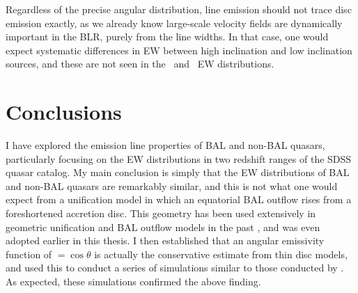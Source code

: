 Regardless of the precise angular distribution, 
line emission should not trace disc emission
exactly, as we already know large-scale velocity fields are dynamically important
in the BLR, purely from the line widths. In that case, one would expect systematic
differences in EW between high inclination and low inclination sources, and these are 
not seen in the \civline\ and \mgline\ EW distributions.

\section{Conclusions}
\label{sec:ew_conclusions}

I have explored the emission line properties of BAL and non-BAL quasars,
particularly focusing on the EW distributions in two redshift ranges of the SDSS
quasar catalog. My main conclusion is simply that the EW distributions of BAL and
non-BAL quasars are remarkably similar, and this is not what one would expect from
a unification model in which an equatorial BAL outflow rises from a foreshortened 
accretion disc. This geometry has been used extensively in 
geometric unification and BAL outflow models in the past 
\citep[e.g.][]{MCGV95,PSK2000,PK04,risalitielvis2010,borguet2010,
higginbottom2013, nomura2013,nomura2016}, and was even adopted earlier in this thesis.
I then established that an angular emissivity function of \ept$=\cos \theta$ 
is actually the conservative estimate from thin disc models, and used this
to conduct a series of simulations similar to those conducted by \cite{risaliti2011}.
As expected, these simulations confirmed the above finding.


